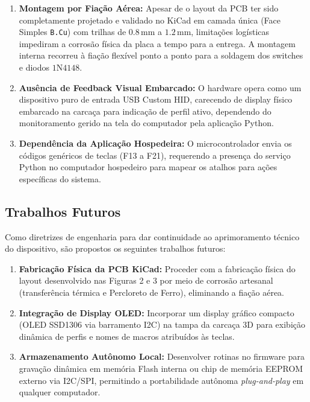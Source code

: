 \documentclass[12pt, a4paper]{article}
\begin{document}
\begin{enumerate}
    \item \textbf{Montagem por Fiação Aérea:} Apesar de o layout da PCB ter sido completamente projetado e validado no KiCad em camada única (Face Simples \texttt{B.Cu}) com trilhas de $0.8\,\text{mm}$ a $1.2\,\text{mm}$, limitações logísticas impediram a corrosão física da placa a tempo para a entrega. A montagem interna recorreu à fiação flexível ponto a ponto para a soldagem dos switches e diodos $1\text{N}4148$.
    \item \textbf{Ausência de Feedback Visual Embarcado:} O hardware opera como um dispositivo puro de entrada USB Custom HID, carecendo de display físico embarcado na carcaça para indicação de perfil ativo, dependendo do monitoramento gerido na tela do computador pela aplicação Python.
    \item \textbf{Dependência da Aplicação Hospedeira:} O microcontrolador envia os códigos genéricos de teclas (F13 a F21), requerendo a presença do serviço Python no computador hospedeiro para mapear os atalhos para ações específicas do sistema.
\end{enumerate}

\subsection{Trabalhos Futuros}
\hspace*{1.25cm}Como diretrizes de engenharia para dar continuidade ao aprimoramento técnico do dispositivo, são propostos os seguintes trabalhos futuros:

\begin{enumerate}
    \item \textbf{Fabricação Física da PCB KiCad:} Proceder com a fabricação física do layout desenvolvido nas Figuras 2 e 3 por meio de corrosão artesanal (transferência térmica e Percloreto de Ferro), eliminando a fiação aérea.
    \item \textbf{Integração de Display OLED:} Incorporar um display gráfico compacto (OLED SSD1306 via barramento I2C) na tampa da carcaça 3D para exibição dinâmica de perfis e nomes de macros atribuídos às teclas.
    \item \textbf{Armazenamento Autônomo Local:} Desenvolver rotinas no firmware para gravação dinâmica em memória Flash interna ou chip de memória EEPROM externo via I2C/SPI, permitindo a portabilidade autônoma \textit{plug-and-play} em qualquer computador.
\end{enumerate}
\end{document}
